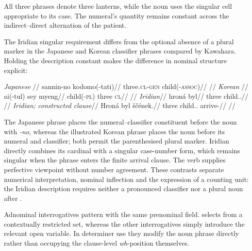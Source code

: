 All three phrases denote three lanterns, while the noun uses the
singular cell appropriate to its case. The numeral's quantity remains
constant across the indirect--direct alternation of the patient.

The Iridian singular requirement differs from the optional absence of a
plural marker in the Japanese and Korean classifier phrases compared by
Kawahara. Holding the description  constant makes the
difference in nominal structure explicit:

\pex\label{ex:nm-comparative-cardinals}
\a
\begingl
\glpreamble \textit{Japanese} \cite[example~6a, p.~341]{kawahara2025}//
\gla sannin-no kodomo(-tati)//
\glb three.\textsc{cl}-\textsc{gen} child(-\textsc{assoc})//
\glft {}//
\endgl
\a
\begingl
\glpreamble \textit{Korean} \cite[example~5b, p.~341]{kawahara2025}//
\gla ai(-tul) sey myeng//
\glb child(-\textsc{pl}) three \textsc{cl}//
\glft {}//
\endgl
\a
\begingl
\glpreamble \textit{Iridian}//
\gla hroná byl//
\glb three child.\Dir{}.\Sg{}//
\glft {}//
\endgl
\a
\begingl
\glpreamble \textit{Iridian; constructed clause}//
\gla Hroná byl ščének.//
\glb three child.\Dir{}.\Sg{} arrive-\Pf{}//
\glft {}
//
\endgl
\xe

The Japanese phrase places the numeral--classifier constituent before the noun with
\textit{-no}, whereas the illustrated Korean phrase places the noun before
its numeral and classifier; both permit the parenthesised plural marker.
Iridian directly combines its cardinal with a singular case-number form,
which remains singular when the phrase enters the finite arrival clause.
The verb supplies perfective viewpoint without number agreement. These
contrasts separate numerical interpretation, nominal inflection and the
expression of a counting unit: the Iridian description requires neither a
pronounced classifier nor a plural noun after .

Adnominal interrogatives pattern with the same prenominal field. 
selects from a contextually restricted set, whereas the other interrogatives
simply introduce the relevant open variable. In determiner use they modify the
noun phrase directly rather than occupying the clause-level \emph{wh}-position
themselves.

\pex
\a {} 
\a {} 
\xe

